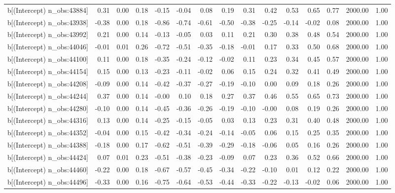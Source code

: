 \begin{table}[ht]
\begin{tabular}{rrrrrrrrrrrrrrr}
  b[(Intercept) n\_obs:43884] & 0.31 & 0.00 & 0.18 & -0.15 & -0.04 & 0.08 & 0.19 & 0.31 & 0.42 & 0.53 & 0.65 & 0.77 & 2000.00 & 1.00 \\ 
  b[(Intercept) n\_obs:43938] & -0.38 & 0.00 & 0.18 & -0.86 & -0.74 & -0.61 & -0.50 & -0.38 & -0.25 & -0.14 & -0.02 & 0.08 & 2000.00 & 1.00 \\ 
  b[(Intercept) n\_obs:43992] & 0.21 & 0.00 & 0.14 & -0.13 & -0.05 & 0.03 & 0.11 & 0.21 & 0.30 & 0.38 & 0.48 & 0.54 & 2000.00 & 1.00 \\ 
  b[(Intercept) n\_obs:44046] & -0.01 & 0.01 & 0.26 & -0.72 & -0.51 & -0.35 & -0.18 & -0.01 & 0.17 & 0.33 & 0.50 & 0.68 & 2000.00 & 1.00 \\ 
  b[(Intercept) n\_obs:44100] & 0.11 & 0.00 & 0.18 & -0.35 & -0.24 & -0.12 & -0.02 & 0.11 & 0.23 & 0.34 & 0.45 & 0.57 & 2000.00 & 1.00 \\ 
  b[(Intercept) n\_obs:44154] & 0.15 & 0.00 & 0.13 & -0.23 & -0.11 & -0.02 & 0.06 & 0.15 & 0.24 & 0.32 & 0.41 & 0.49 & 2000.00 & 1.00 \\ 
  b[(Intercept) n\_obs:44208] & -0.09 & 0.00 & 0.14 & -0.42 & -0.37 & -0.27 & -0.19 & -0.10 & 0.00 & 0.09 & 0.18 & 0.26 & 2000.00 & 1.00 \\ 
  b[(Intercept) n\_obs:44244] & 0.37 & 0.00 & 0.14 & -0.00 & 0.10 & 0.18 & 0.27 & 0.37 & 0.46 & 0.55 & 0.65 & 0.73 & 2000.00 & 1.00 \\ 
  b[(Intercept) n\_obs:44280] & -0.10 & 0.00 & 0.14 & -0.45 & -0.36 & -0.26 & -0.19 & -0.10 & -0.00 & 0.08 & 0.19 & 0.26 & 2000.00 & 1.00 \\ 
  b[(Intercept) n\_obs:44316] & 0.13 & 0.00 & 0.14 & -0.25 & -0.15 & -0.05 & 0.03 & 0.13 & 0.23 & 0.31 & 0.40 & 0.48 & 2000.00 & 1.00 \\ 
  b[(Intercept) n\_obs:44352] & -0.04 & 0.00 & 0.15 & -0.42 & -0.34 & -0.24 & -0.14 & -0.05 & 0.06 & 0.15 & 0.25 & 0.35 & 2000.00 & 1.00 \\ 
  b[(Intercept) n\_obs:44388] & -0.18 & 0.00 & 0.17 & -0.62 & -0.51 & -0.39 & -0.29 & -0.18 & -0.06 & 0.05 & 0.16 & 0.26 & 2000.00 & 1.00 \\ 
  b[(Intercept) n\_obs:44424] & 0.07 & 0.01 & 0.23 & -0.51 & -0.38 & -0.23 & -0.09 & 0.07 & 0.23 & 0.36 & 0.52 & 0.66 & 2000.00 & 1.00 \\ 
  b[(Intercept) n\_obs:44460] & -0.22 & 0.00 & 0.18 & -0.67 & -0.57 & -0.45 & -0.34 & -0.22 & -0.10 & 0.01 & 0.12 & 0.22 & 2000.00 & 1.00 \\ 
  b[(Intercept) n\_obs:44496] & -0.33 & 0.00 & 0.16 & -0.75 & -0.64 & -0.53 & -0.44 & -0.33 & -0.22 & -0.13 & -0.02 & 0.06 & 2000.00 & 1.00 \\ 

\end{tabular}
\end{table}
